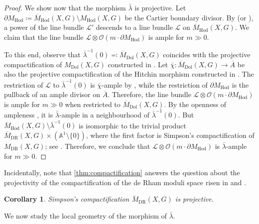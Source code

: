 \documentclass[JEP,XML,SOM,Unicode, NoEqCountersInSection,NoFloatCountersInSection,published]{cedram}
\let\mathcal\mathscr
\newtheorem{cor}[thm]{Corollary}
\theoremstyle{definition}
\newcommand{\MDolG}{{M}_{\mathrm{Dol}}(X,G)}
\newcommand{\MDRG}{{M}_{\mathrm{DR}}(X,G)}
\newcommand{\MHodG}{{M}_{\mathrm{Hod}}(X,G)}
\newcommand{\MHod}{{M}_{\mathrm{Hod}}}
\newcommand{\bMHodG}{\overline{M}_{\mathrm{Hod}}(X,G)}
\newcommand{\bMDolG}{\overline{M}_{\mathrm{Dol}}(X,G)}
\newcommand{\bMDRG}{\overline{M}_{\mathrm{DR}}(X,G)}
\begin{document}
\begin{proof}
We show now that the morphism $\bar{\lambda}$ is projective.
Let $\partial\MHod \coloneqq \bMHodG \setminus \MHodG$ be the Cartier boundary divisor. By \cite[Th.\,2.3]{DN89} (or \cite[Proof of Prop.\,3.2.2]{deCataldo2020}), a power of the line bundle $\mathcal{L}'$ descends to a line bundle $\mathcal{L}$ on $\bMHodG$. We claim that the line bundle $\mathcal{L}\otimes \mathcal{O}(m\cdot \partial\MHod)$ is ample for $m \gg 0$.

To this end, observe that $\bar{\lambda}^{-1}(0) \eqqcolon \bMDolG$ coincides with the projective compactification of $\MDolG$ constructed in \cite[Th.\,3.1.1(1)]{deCataldo2020}. Let $\bar{\chi}: \bMDolG \to \overline{A}$ be also the projective compactification of the Hitchin morphism constructed in \cite[Th.\,3.1.1(2)]{deCataldo2020}. The restriction of $\mathcal{L}$ to $\bar{\lambda}^{-1}(0)$ is $\bar{\chi}$-ample by \cite[Prop.\,3.2.2]{deCataldo2020}, while the restriction of $\partial M_{\mathrm{Hod}}$ is the pullback of an ample divisor on $\overline{A}$. Therefore, the line bundle $\mathcal{L}\otimes \mathcal{O}(m \cdot \partial\MHod)$ is ample for $m \gg 0$ when restricted to $\bMDolG$. By the openness of ampleness \cite[Th.\,1.2.17]{Lazarsfeld2004}, it is $\bar{\lambda}$-ample in a neighbourhood of $\bar{\lambda}^{-1}(0)$. But $\bMHodG \setminus \bar{\lambda}^{-1}(0)$ is isomorphic to the trivial product $\bMDRG \times (\mathbb{A}^1 \setminus \{0\})$, where the first factor is Simpson's compactification of $\MDRG$; see \cite[\S 11]{Simpson1997}. Therefore, we conclude that $\mathcal{L}\otimes \mathcal{O}(m\cdot \partial\MHod)$ is $\bar{\lambda}$-ample for $m\gg0$.
\end{proof}

Incidentally, note that \cref{thm:compactification} answers the question about the projectivity of the compactification of the de Rham moduli space risen in \cite[p.\,268]{Simpson1997} and \cite[Rem.\,3.1.2]{deCataldo2020}.
\begin{cor}\label{cor:compactificationdeRhamproj}
Simpson's compactification $\bMDRG$ is projective.
\end{cor}
We now study the local geometry of the morphism of $\bar{\lambda}$.
\end{document}
